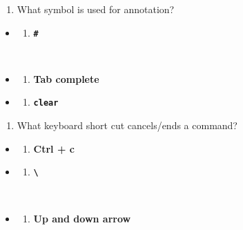 \documentclass[
  letterpaper,
  DIV=11,
  numbers=noendperiod]{scrreprt}
\providecommand{\tightlist}{%
  \setlength{\itemsep}{0pt}\setlength{\parskip}{0pt}}
\begin{document}
\begin{enumerate}
\def\labelenumi{\arabic{enumi}.}
\setcounter{enumi}{2}
\tightlist
\item
  What symbol is used for annotation?
\end{enumerate}

\begin{itemize}
\tightlist
\item
  \begin{enumerate}
  \def\labelenumi{(\Alph{enumi})}
  \tightlist
  \item
    \textbf{\texttt{\#}}\strut \\
  \end{enumerate}
\item
  \begin{enumerate}
  \def\labelenumi{(\Alph{enumi})}
  \setcounter{enumi}{1}
  \tightlist
  \item
    \textbf{Tab complete}\\
  \end{enumerate}
\item
  \begin{enumerate}
  \def\labelenumi{(\Alph{enumi})}
  \setcounter{enumi}{2}
  \tightlist
  \item
    \textbf{\texttt{clear}}
  \end{enumerate}
\end{itemize}

\begin{enumerate}
\def\labelenumi{\arabic{enumi}.}
\setcounter{enumi}{3}
\tightlist
\item
  What keyboard short cut cancels/ends a command?
\end{enumerate}

\begin{itemize}
\tightlist
\item
  \begin{enumerate}
  \def\labelenumi{(\Alph{enumi})}
  \tightlist
  \item
    \textbf{Ctrl + c}\\
  \end{enumerate}
\item
  \begin{enumerate}
  \def\labelenumi{(\Alph{enumi})}
  \setcounter{enumi}{1}
  \tightlist
  \item
    \textbf{\texttt{\textbackslash{}}}\strut \\
  \end{enumerate}
\item
  \begin{enumerate}
  \def\labelenumi{(\Alph{enumi})}
  \setcounter{enumi}{2}
  \tightlist
  \item
    \textbf{Up and down arrow}
  \end{enumerate}
\end{itemize}
\end{document}
